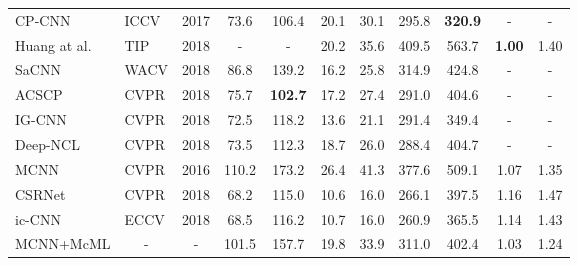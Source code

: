 \documentclass[sigconf]{acmart}
\begin{document}
\begin{table}[t]
\begin{center}
\begin{tabular}{|lll|cc|cc|cc|cc|}
\multicolumn{1}{|l|}{CP-CNN~\cite{deep-multi-pyramid-cnn-17}}          & ICCV                  & 2017 & 73.6             & 106.4           & 20.1            & 30.1             & 295.8           & \textbf{320.9}          & -             & -             \\
\multicolumn{1}{|l|}{Huang at al.~\cite{deep-body-BSAD-18}}    & TIP & 2018 & -                & -               & 20.2            & 35.6             & 409.5           & 563.7          & \textbf{1.00}         & 1.40          \\
\multicolumn{1}{|l|}{SaCNN~\cite{deep-fscale-multitask-SaCNN-18}}           & WACV                  & 2018 & 86.8             & 139.2           & 16.2            & 25.8             & 314.9           & 424.8          & -             & -             \\
\multicolumn{1}{|l|}{ACSCP~\cite{deep-gan-loss-ACSCP-18}}           & CVPR                  & 2018 & 75.7             & \textbf{102.7}           & 17.2            & 27.4             & 291.0           & 404.6          & -             & -             \\
\multicolumn{1}{|l|}{IG-CNN~\cite{deep-auto-IGCNN-18}}          & CVPR                  & 2018 & 72.5             & 118.2           & 13.6            & 21.1             & 291.4           & 349.4          & -             & -             \\
\multicolumn{1}{|l|}{Deep-NCL~\cite{deep-training-ConvNet-18}}        & CVPR                  & 2018 & 73.5             & 112.3           & 18.7            & 26.0             & 288.4           & 404.7          & -             & -             \\ \hline
\multicolumn{1}{|l|}{MCNN~\cite{MCNN-16}}            & CVPR                  & 2016 & 110.2            & 173.2           & 26.4            & 41.3             & 377.6           & 509.1          & 1.07          & 1.35          \\
\multicolumn{1}{|l|}{CSRNet~\cite{CSRNet-18}}          & CVPR                  & 2018 & 68.2             & 115.0           & 10.6            & 16.0             & 266.1           & 397.5          & 1.16          & 1.47          \\
\multicolumn{1}{|l|}{ic-CNN~\cite{deep-training-ICCNN-18}}           & ECCV                  & 2018 & 68.5  & 116.2 & 10.7 & 16.0   & 260.9 & 365.5 & 1.14 & 1.43       \\ \hline
\multicolumn{1}{|l|}{MCNN+McML}     & \multicolumn{1}{c}{-} & \multicolumn{1}{c|}{-} & 101.5 & 157.7 & 19.8 & 33.9 & 311.0   & 402.4 & 1.03  & 1.24     \\

\end{tabular}
\end{center}
\end{table}
\end{document}
